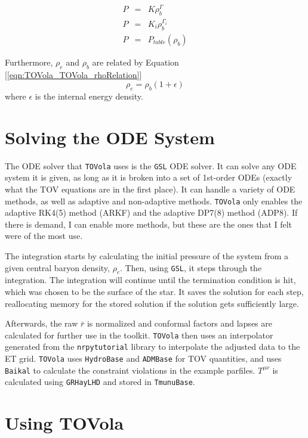 \begin{eqnarray}
    P & = & K\rho_b^{\Gamma} \\
    P & = & K_i\rho_b^{\Gamma_i} \\
    P & = & P_{table}(\rho_b)
\end{eqnarray}

Furthermore, $\rho_e$ and $\rho_b$ are related by Equation [\ref{eqn:TOVola_TOVola_rhoRelation}]
\begin{equation}\label{eqn:TOVola_TOVola_rhoRelation}
\rho_e = \rho_b(1+\epsilon)
\end{equation}
where $\epsilon$ is the internal energy density.

\section{Solving the ODE System}

The ODE solver that \texttt{TOVola} uses is the \texttt{GSL} ODE solver. It can solve any ODE system it is given, as long as it is broken into a set of 1st-order ODEs (exactly what the TOV equations are in the first place). It can handle a variety of ODE methods, as well as adaptive and non-adaptive methods. \texttt{TOVola} only enables the adaptive RK4(5) method (ARKF) and the adaptive DP7(8) method (ADP8). If there is demand, I can enable more methods, but these are the ones that I felt were of the most use.

The integration starts by calculating the initial pressure of the system from a given central baryon density, $\rho_c$. Then, using \texttt{GSL}, it steps through the integration. The integration will continue until the termination condition is hit, which was chosen to be the surface of the star. It saves the solution for each step, reallocating memory for the stored solution if the solution gets sufficiently large.

Afterwards, the raw $\bar{r}$ is normalized and conformal factors and lapses are calculated for further use in the toolkit. \texttt{TOVola} then uses an interpolator generated from the \texttt{nrpytutorial}\cite{TOVola_TOVola_NRpy} library to interpolate the adjusted data to the ET grid. \texttt{TOVola} uses \texttt{HydroBase} and \texttt{ADMBase} for TOV quantities, and uses \texttt{Baikal} to calculate the constraint violations in the example parfiles. $T^{\mu\nu}$ is calculated using \texttt{GRHayLHD} and stored in \texttt{TmunuBase}.

\section{Using TOVola}

